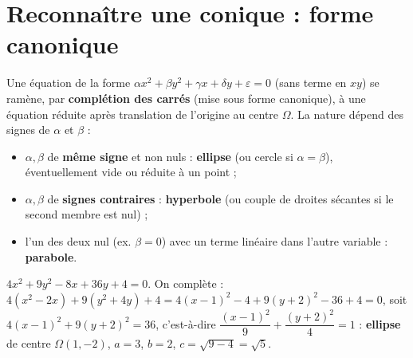 \section{Reconnaître une conique : forme canonique}

\begin{theoreme}[Réduction de $\alpha x^{2}+\beta y^{2}+\gamma x+\delta y+\varepsilon=0$]
Une équation de la forme $\alpha x^{2}+\beta y^{2}+\gamma x+\delta y+\varepsilon=0$ (sans
terme en $xy$) se ramène, par \textbf{complétion des carrés} (mise sous forme canonique), à
une équation réduite après translation de l'origine au centre $\Omega$. La nature dépend
des signes de $\alpha$ et $\beta$ :
\begin{itemize}
\item $\alpha,\beta$ de \textbf{même signe} et non nuls : \textbf{ellipse} (ou cercle si
$\alpha=\beta$), éventuellement vide ou réduite à un point ;
\item $\alpha,\beta$ de \textbf{signes contraires} : \textbf{hyperbole} (ou couple de
droites sécantes si le second membre est nul) ;
\item l'un des deux nul (ex. $\beta=0$) avec un terme linéaire dans l'autre variable :
\textbf{parabole}.
\end{itemize}
\end{theoreme}

\begin{exemple}
$4x^{2}+9y^{2}-8x+36y+4=0$. On complète :
$4(x^{2}-2x)+9(y^{2}+4y)+4=4(x-1)^{2}-4+9(y+2)^{2}-36+4=0$,
soit $4(x-1)^{2}+9(y+2)^{2}=36$, c'est-à-dire
$\dfrac{(x-1)^{2}}{9}+\dfrac{(y+2)^{2}}{4}=1$ : \textbf{ellipse} de centre $\Omega(1,-2)$,
$a=3$, $b=2$, $c=\sqrt{9-4}=\sqrt5$.
\end{exemple}

\begin{illus}
\end{illus}

